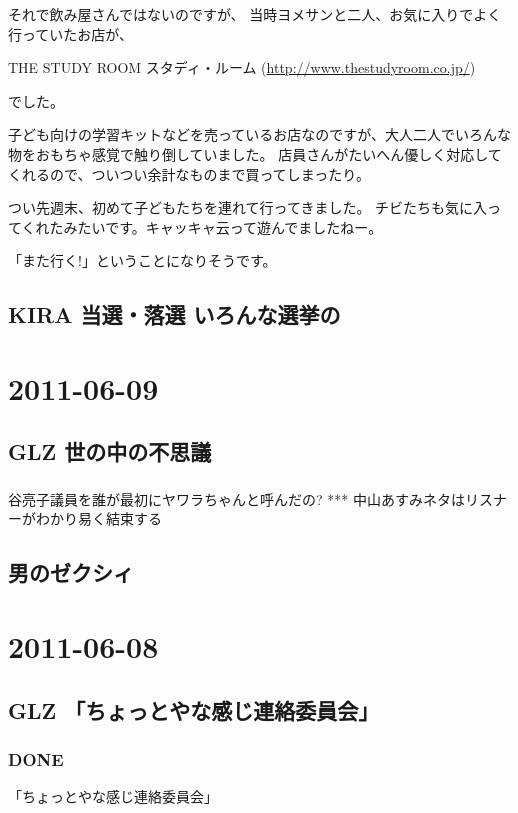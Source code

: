 \documentclass[11pt]{article}
\begin{document}
それで飲み屋さんではないのですが、
当時ヨメサンと二人、お気に入りでよく行っていたお店が、

 THE STUDY ROOM スタディ・ルーム (\href{http://www.thestudyroom.co.jp/}{http://www.thestudyroom.co.jp/})
 
でした。

子ども向けの学習キットなどを売っているお店なのですが、大人二人でいろんな物をおもちゃ感覚で触り倒していました。
店員さんがたいへん優しく対応してくれるので、ついつい余計なものまで買ってしまったり。

つい先週末、初めて子どもたちを連れて行ってきました。
チビたちも気に入ってくれたみたいです。キャッキャ云って遊んでましたねー。

「また行く!」ということになりそうです。
\subsection{KIRA 当選・落選 いろんな選挙の}
\label{sec-110_2}
\section{2011-06-09}
\label{sec-111}
\subsection{GLZ 世の中の不思議}
\label{sec-111_1}
\subsubsection{}

谷亮子議員を誰が最初にヤワラちゃんと呼んだの?
***
中山あすみネタはリスナーがわかり易く結束する
\subsection{男のゼクシィ}
\label{sec-111_2}
\section{2011-06-08}
\label{sec-112}
\subsection{GLZ 「ちょっとやな感じ連絡委員会」}
\label{sec-112_1}
\subsubsection{\textbf{DONE}}
\label{sec-112_1_1}

「ちょっとやな感じ連絡委員会」
\end{document}
